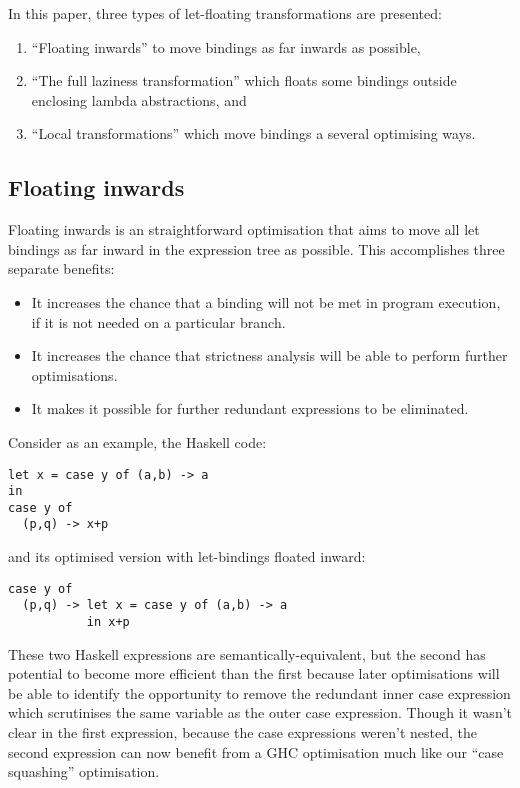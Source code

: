 In this paper, three types of let-floating transformations are presented:
\begin{enumerate}
\item ``Floating inwards'' to move bindings as far inwards as possible,
\item ``The full laziness transformation'' which floats some bindings outside enclosing lambda abstractions, and
\item ``Local transformations'' which move bindings a several optimising ways.\citep{jones1996}
\end{enumerate}

\subsection*{Floating inwards}

Floating inwards is an straightforward optimisation that aims to move all let bindings as far inward in the expression tree as possible. This accomplishes three separate benefits:
\begin{itemize}
\item It increases the chance that a binding will not be met in program execution, if it is not needed on a particular branch.
\item It increases the chance that strictness analysis will be able to perform further optimisations.
\item It makes it possible for further redundant expressions to be eliminated.\citep{jones1996}
\end{itemize}

Consider as an example, the Haskell code:
\begin{lstlisting}
let x = case y of (a,b) -> a
in
case y of
  (p,q) -> x+p
\end{lstlisting}

and its optimised version with let-bindings floated inward:
\begin{lstlisting}
case y of
  (p,q) -> let x = case y of (a,b) -> a
           in x+p
\end{lstlisting}

These two Haskell expressions are semantically-equivalent, but the second has potential to become more efficient than the first because later optimisations will be able to identify the opportunity to remove the redundant inner case expression which scrutinises the same variable as the outer case expression.\citep{jones1996} Though it wasn't clear in the first expression, because the case expressions weren't nested, the second expression can now benefit from a GHC optimisation much like our ``case squashing'' optimisation.

